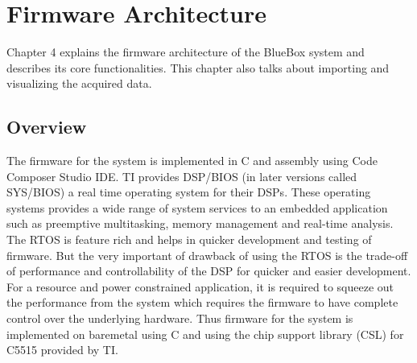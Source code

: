 \chapter{Firmware Architecture}

Chapter 4 explains the firmware architecture of the BlueBox system and describes its core functionalities. This chapter also talks about importing and visualizing the acquired data.

\section{Overview}
The firmware for the system is implemented in C and assembly using Code Composer Studio IDE. TI provides DSP/BIOS (in later versions called SYS/BIOS)  a real time operating system for their DSPs. These operating systems provides a wide range of system services to an embedded application such as preemptive multitasking, memory management and real-time analysis. The RTOS is feature rich and helps in quicker development and testing of firmware. But the very important of drawback of using the RTOS is the trade-off of performance and controllability of the DSP for quicker and easier development. For a resource and power constrained application, it is required to squeeze out the performance from the system which requires the firmware to have complete control over the underlying hardware. Thus firmware for the system is implemented on baremetal using  C and using the chip support library (CSL) for C5515 provided by TI. 


\vfill


